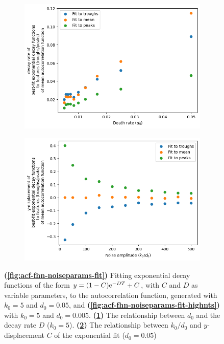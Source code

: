 \begin{figure}
  \begin{subfigure}[t]{0.45\textwidth}
  \centering
    \includegraphics[width=\linewidth]{fhn_deathrate_vs_decay.png}
    \caption{
    }
    \label{fig:acf-fhn-noiseparams-noisetimescale}
  \end{subfigure}%
  \begin{subfigure}[t]{0.45\textwidth}
  \centering
    \includegraphics[width=\linewidth]{fhn_birthrate_vs_ydispl.png}
    \caption{
    }
    \label{fig:acf-fhn-noiseparams-noiseamplitude}
  \end{subfigure}

  \caption{
    \textbf{(\ref{fig:acf-fhn-noiseparams-fit})}
    Fitting exponential decay functions of the form $y = (1-C)\mathrm{e}^{-DT}+C$, with $C$ and $D$ as variable parameters, to the autocorrelation function, generated with $k_{0}=5$ and $d_{0}=0.05$, and
    \textbf{(\ref{fig:acf-fhn-noiseparams-fit-highnts})}
    with $k_{0}=5$ and $d_{0}=0.005$.
    \textbf{(\ref{fig:acf-fhn-noiseparams-noisetimescale})}
    The relationship between $d_{0}$ and the decay rate $D$ ($k_{0}=5$).
    \textbf{(\ref{fig:acf-fhn-noiseparams-noiseamplitude})}
    The relationship between $k_{0}/d_{0}$ and $y$-displacement $C$ of the exponential fit ($d_{0}=0.05$)
  }
  \label{fig:acf-fhn-noiseparams}
\end{figure}

